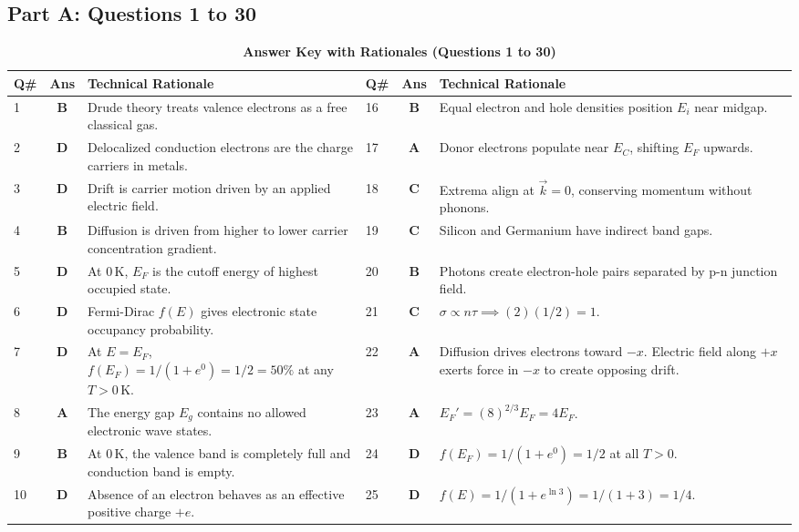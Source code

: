 \subsection*{Part A: Questions 1 to 30}
\begin{table}[htbp]
\centering
\caption{\textbf{Answer Key with Rationales (Questions 1 to 30)}}
\vspace{2mm}
\small
\begin{tabularx}{\textwidth}{l c X l c X}
\toprule
\textbf{Q\#} & \textbf{Ans} & \textbf{Technical Rationale} & \textbf{Q\#} & \textbf{Ans} & \textbf{Technical Rationale} \\
\midrule
1 & \textbf{B} & Drude theory treats valence electrons as a free classical gas. & 16 & \textbf{B} & Equal electron and hole densities position $E_i$ near midgap. \\
2 & \textbf{D} & Delocalized conduction electrons are the charge carriers in metals. & 17 & \textbf{A} & Donor electrons populate near $E_C$, shifting $E_F$ upwards. \\
3 & \textbf{D} & Drift is carrier motion driven by an applied electric field. & 18 & \textbf{C} & Extrema align at $\vec{k}=0$, conserving momentum without phonons. \\
4 & \textbf{B} & Diffusion is driven from higher to lower carrier concentration gradient. & 19 & \textbf{C} & Silicon and Germanium have indirect band gaps. \\
5 & \textbf{D} & At $0\,\text{K}$, $E_F$ is the cutoff energy of highest occupied state. & 20 & \textbf{B} & Photons create electron-hole pairs separated by p-n junction field. \\
6 & \textbf{D} & Fermi-Dirac $f(E)$ gives electronic state occupancy probability. & 21 & \textbf{C} & $\sigma \propto n \tau \implies (2)(1/2) = 1$. \\
7 & \textbf{D} & At $E = E_F$, $f(E_F) = 1/(1+e^0) = 1/2 = 50\%$ at any $T > 0\,\text{K}$. & 22 & \textbf{A} & Diffusion drives electrons toward $-x$. Electric field along $+x$ exerts force in $-x$ to create opposing drift. \\
8 & \textbf{A} & The energy gap $E_g$ contains no allowed electronic wave states. & 23 & \textbf{A} & $E_F' = (8)^{2/3} E_F = 4 E_F$. \\
9 & \textbf{B} & At $0\,\text{K}$, the valence band is completely full and conduction band is empty. & 24 & \textbf{D} & $f(E_F) = 1/(1+e^0) = 1/2$ at all $T > 0$. \\
10 & \textbf{D} & Absence of an electron behaves as an effective positive charge $+e$. & 25 & \textbf{D} & $f(E) = 1/(1 + e^{\ln 3}) = 1/(1+3) = 1/4$. \\

\end{tabularx}
\end{table}
